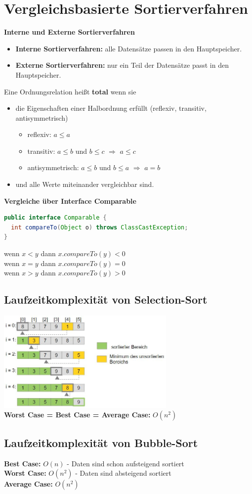 \documentclass{scrreprt}
\begin{document}
\section{Vergleichsbasierte Sortierverfahren}
\textbf{Interne und Externe Sortierverfahren}
\begin{itemize}
  \item \textbf{Interne Sortierverfahren:} alle Datensätze passen in den Hauptspeicher.
  \item \textbf{Externe Sortierverfahren:} nur ein Teil der Datensätze passt in den Hauptspeicher.
\end{itemize}
Eine Ordnungsrelation heißt \textbf{total} wenn sie
\begin{itemize}
  \item die Eigenschaften einer Halbordnung erfüllt (reflexiv, transitiv, antisymmetrisch)
  \begin{itemize}
    \item reflexiv: $a \leq a$
    \item transitiv: $a \leq b$ und $b \leq c$ $\Rightarrow$ $a \leq c$
    \item antisymmetrisch: $a \leq b$ und $b \leq a$ $\Rightarrow$ $a = b$
  \end{itemize}
  \item und alle Werte miteinander vergleichbar sind.
\end{itemize}
\textbf{Vergleiche über Interface Comparable}
\begin{lstlisting}[language=Java]
public interface Comparable {
  int compareTo(Object o) throws ClassCastException;
}
\end{lstlisting}
wenn $x < y$ dann $x.compareTo(y) < 0$
\\wenn $x = y$ dann $x.compareTo(y) = 0$
\\wenn $x > y$ dann $x.compareTo(y) > 0$
\subsection{Laufzeitkomplexität von Selection-Sort}
\includegraphics[width=0.65\textwidth]{graphics/Selectionsort}
\\\textbf{Worst Case = Best Case = Average Case:} $O(n^2)$
\subsection{Laufzeitkomplexität von Bubble-Sort}
\textbf{Best Case:} $O(n)$ - Daten sind schon aufsteigend sortiert
\\\textbf{Worst Case:} $O(n^2)$ - Daten sind absteigend sortiert
\\\textbf{Average Case:} $O(n^2)$
\end{document}
